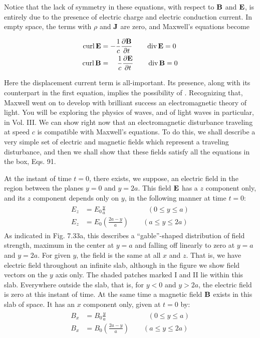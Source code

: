 Notice that the lack of symmetry in these equations, with respect
to $\mathbf{B}$ and $\mathbf{E}$, is entirely due to the presence of electric charge and 
electric conduction current. In empty space, the terms with $\rho$ and $\mathbf{J}$ are
zero, and Maxwell's equations become
\begin{framed}
\begin{align}
\begin{split}
  \operatorname{curl}\mathbf{E} &= -\frac{1}{c}\frac{\partial\mathbf{B}}{\partial t} \qquad
  \operatorname{div}\mathbf{E} = 0 \\
  \operatorname{curl}\mathbf{B} &= \quad \frac{1}{c}\frac{\partial\mathbf{E}}{\partial t} \qquad
  \operatorname{div}\mathbf{B} = 0
\end{split}  
\end{align}
\end{framed}

Here the displacement current term is all-important. Its presence,
along with its counterpart in the first equation, implies the possibility
of . Recognizing that, Maxwell went on to
develop with brilliant success an electromagnetic theory of light.
You will be exploring the physics of waves, and of light waves in
particular, in Vol. III. We can show right now that an electromagnetic
disturbance traveling at speed $c$ is compatible with Maxwell's
equations. To do this, we shall describe a very simple set of electric
and magnetic fields which represent a traveling disturbance, and
then we shall show that these fields satisfy all the equations in the
box, Eqs. 91.

At the instant of time $t = 0$, there exists, we suppose, an electric
field in the region between the planes $y = 0$ and $y = 2a$. This field $\mathbf{E}$
has a $z$ component only, and its $z$ component depends only on $y$, in
the following manner at time $t=0$:
\begin{align}
\begin{split}
  E_z &= E_0\frac{y}{a}        \qquad\qquad\qquad (0\le y \le a) \\
  E_z &= E_0\left(\frac{2a-y}{a}\right) \qquad (a \le y \le 2a)
\end{split}
\end{align}
As indicated in Fig. 7.33a, this describes a ``gable''-shaped distribution
of field strength, maximum in the center at $y = a$ and falling off
linearly to zero at $y = a$ and $y = 2a$. For given $y$, the field is the
same at all $x$ and $z$. That is, we have electric field throughout an
infinite slab, although in the figure we show field vectors on the $y$ axis
only. The shaded patches marked I and II lie within this slab.
Everywhere outside the slab, that is, for $y < 0$ and $y > 2a$, the electric
field is zero at this instant of time. At the same time a magnetic
field $\mathbf{B}$ exists in this slab of space. It has an $x$ component only,
given at $t=0$ by:
\begin{align}
\begin{split}
  B_x &= B_0\frac{y}{a}        \qquad\qquad\qquad (0\le y \le a) \\
  B_x &= B_0\left(\frac{2a-y}{a}\right) \qquad (a \le y \le 2a)
\end{split}
\end{align}

